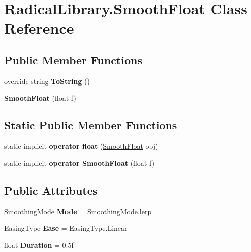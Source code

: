\hypertarget{class_radical_library_1_1_smooth_float}{}\section{Radical\+Library.\+Smooth\+Float Class Reference}
\label{class_radical_library_1_1_smooth_float}
\subsection*{Public Member Functions}
\begin{DoxyCompactItemize}
\item 
\mbox{\label{class_radical_library_1_1_smooth_float_aa900ef9074a4ae88ce65a2a562b98433}} 
override string {\bfseries To\+String} ()
\item 
\mbox{\label{class_radical_library_1_1_smooth_float_a982a3005f927fe86a7d032bfd794a15c}} 
{\bfseries Smooth\+Float} (float f)
\end{DoxyCompactItemize}
\subsection*{Static Public Member Functions}
\begin{DoxyCompactItemize}
\item 
\mbox{\label{class_radical_library_1_1_smooth_float_a468aab25d1723a1022bf25a9c55796f7}} 
static implicit {\bfseries operator float} (\hyperlink{class_radical_library_1_1_smooth_float}{Smooth\+Float} obj)
\item 
\mbox{\label{class_radical_library_1_1_smooth_float_a214d38b22fe1158b8a80fb8a3aa147d1}} 
static implicit {\bfseries operator Smooth\+Float} (float f)
\end{DoxyCompactItemize}
\subsection*{Public Attributes}
\begin{DoxyCompactItemize}
\item 
\mbox{\label{class_radical_library_1_1_smooth_float_a65b07f9543c0c2eb486b2220c1d8c200}} 
Smoothing\+Mode {\bfseries Mode} = Smoothing\+Mode.\+lerp
\item 
\mbox{\label{class_radical_library_1_1_smooth_float_a0ca55cc46792c8a3b019495aa6ce2a8f}} 
Easing\+Type {\bfseries Ease} = Easing\+Type.\+Linear
\item 
\mbox{\label{class_radical_library_1_1_smooth_float_aabe3fb912c052ec1ba1897a990f14292}} 
float {\bfseries Duration} = 0.\+5f
\end{DoxyCompactItemize}
